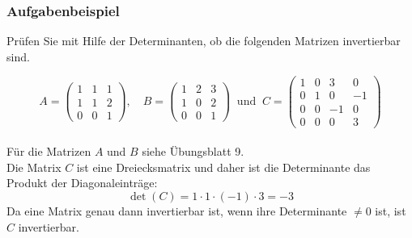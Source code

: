 \begin{frame}\frametitle{Aufgabenbeispiel}

Prüfen Sie mit Hilfe der Determinanten, ob die folgenden Matrizen invertierbar sind.

$$
A=\begin{pmatrix} 1 & 1 & 1 \\ 1 & 1 &2 \\ 0&0&1\end{pmatrix}, \quad 
B=\begin{pmatrix} 1 & 2 & 3 \\ 1 & 0 &2 \\ 0&0&1\end{pmatrix} \ \text{ und } \
C=\begin{pmatrix}
		1	& 0	&  3	& 0	\\
		0	& 1	&  0	& -1	\\
		0	& 0	&  -1	& 0\\
		0	& 0	&  0& 3
	\end{pmatrix}
$$
\pause
{}\\
Für die Matrizen $A$ und $B$ siehe Übungsblatt 9.\\
Die Matrix $C$ ist eine Dreiecksmatrix und daher ist die Determinante das Produkt der Diagonaleinträge:
$$
\det(C)=1\cdot1\cdot(-1)\cdot3=-3
$$
Da eine Matrix genau dann invertierbar ist, wenn ihre Determinante $\ne0$ ist, ist $C$ invertierbar.
\end{frame}
%
